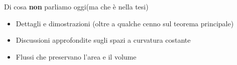 \begin{comment}{Di cosa parliamo oggi}{}
\begin{itemize}
	\item Alexandrov Moving Planes Method
	\item Il risultato di Chow-Gulliver
	\item Alcune conseguenze e corollari
	\item Cenni sull'estensione a spazi a curvatura costante
\end{itemize}
\end{comment}



\begin{frame}{Di cosa \textbf{non} parliamo oggi}{(ma che è nella tesi)}

\begin{itemize}
	\item Dettagli e dimostrazioni (oltre a qualche cenno sul teorema principale)
	\item Discussioni approfondite sugli spazi a curvatura costante
	\item Flussi che preservano l'area e il volume
\end{itemize}
\end{frame}

